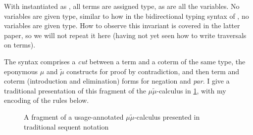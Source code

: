 \noindent
\begin{minipage}[t]{0.5\textwidth}
\end{minipage}
\begin{minipage}[t]{0.5\textwidth}
\end{minipage}

With  instantiated as , all terms are assigned
 type, as are all the variables.
No variables are given  type, similar to how in
the bidirectional typing syntax of \citet[p.~25]{AACMM21}, no variables are
given  type.
How to observe this invariant is covered in the latter paper, so we will not
repeat it here (having not yet seen how to write traversals on terms).

The syntax comprises a \emph{cut} between a term and a coterm of the same type,
the eponymous $\mu$ and $\tilde\mu$ constructs for proof by contradiction, and
then term and coterm (introduction and elimination) forms for negation and
\emph{par}.
I give a traditional presentation of this fragment of the
$\mu\tilde\mu$-calculus in \cref{fig:mmt-orig}, with my encoding of the rules
below.


\begin{figure}
  \caption{A fragment of a usage-annotated $\mu\tilde\mu$-calculus presented in
    traditional sequent notation}
  \label{fig:mmt-orig}
\end{figure}

